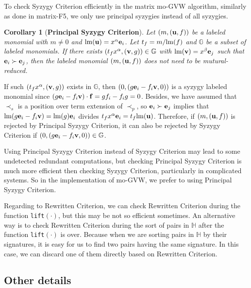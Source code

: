 \documentclass[final, number, 3p,12pt]{elsarticle}
\newtheorem{cor}[theorem]{Corollary}
\def\G{{\mathbb{G}}}
\def\H{{\mathbb{H}}}
\def\lm{{\rm lm}} %
\def\f{{\bf f}}
\def\e{{\bf e}}
\def\u{{\bf u}}
\def\v{{\bf v}}
\begin{document}
To check Syzygy Criterion efficiently in the matrix mo-GVW algorithm, similarly as done in matrix-F5, we only use principal syzygies instead of all syzygies. 

\begin{cor}[{\bf Principal Syzygy Criterion}]
Let $(m, (\u, f))$ be a labeled monomial with $m\not=0$ and $\lm(\u) = x^\alpha\e_i$. Let $t_f = m/\lm(f)$ and $\G$ be a subset of labeled monomials. If there exists $(t_f x^\alpha, (\v, g)) \in \G$ with $\lm(\v) = x^\beta\e_j$ such that $\e_i \succ \e_j$, then the labeled monomial $(m, (\u, f))$ does not need to be mutural-reduced.
\end{cor}


If such $(t_f x^\alpha, (\v, g))$ exists in $\G$, then $(0, (g\e_i - f_i\v , 0))$ is a syzygy labeled monomial since $(g\e_i - f_i\v)\cdot \f = g f_i - f_i g = 0$.  Besides, we have assumed that $\prec_s$ is a position over term extension of $\prec_p$, so $\e_i \succ \e_j$ implies that $\lm(g\e_i - f_i\v) = \lm(g)\e_i$ divides $t_f x^\alpha\e_i = t_f \lm(\u)$. Therefore, if $(m, (\u, f))$ is rejected by Principal Syzygy Criterion, it can also be rejected by Syzygy Criterion if $(0, (g\e_i - f_i\v , 0))\in \G$.

Using Principal Syzygy Criterion instead of Syzygy Criterion may lead to some undetected redundant computations, but checking Principal Syzygy Criterion  is much more efficient then checking Syzygy Criterion, particularly in complicated systems. So in the implementation of mo-GVW, we prefer to using Principal Syzygy Criterion.


Regarding to Rewritten Criterion, we can check Rewritten Criterion during the function {\tt lift}$(\cdot)$, but this may be not so efficient sometimes. An alternative way is to check Rewritten Criterion during the sort of pairs in $\H$ after the function {\tt lift}$(\cdot)$ is over. Because when we are sorting pairs in $\H$ by their signatures, it is easy for us to find two pairs having the same signature. In this case, we can discard one of them directly based on Rewritten Criterion. 




\subsection{Other details} \label{subsec_others}


\end{document}
